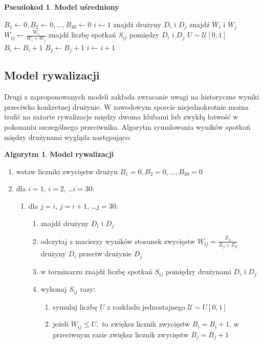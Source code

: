 \documentclass[inzynierska]{pwr_wmat_praca_dyplomowa}
\theoremstyle{plain}
\numberwithin{theorem}{chapter}
\theoremstyle{definition}
\numberwithin{theorem}{chapter}
\newtheorem{algorytm}[theorem]{Algorytm}
\newtheorem{pseudokod}[theorem]{Pseudokod}
\begin{document}
\begin{pseudokod}
	\textbf{Model uśredniony}
	\begin{algorithmic}[1]
		\State $B_1\gets 0,B_2\gets 0,\dots, B_{30}\gets 0$
		\State $i\gets 1$
		\State znajdź drużyny $D_i$ i $D_j$
		\State znajdź $W_i$ i $W_j$ 
		\State $W_{ij}\gets\frac{W_i}{W_i + W_j}$
		\State znajdź liczbę spotkań $S_{ij}$ pomiędzy $D_i$ i $D_j$
		\State $U\sim \mathcal{U}[0,1]$
		\State $B_i \gets B_i+1$
		\Else
		\State $B_j \gets B_j+1$
		\EndIf
		\EndFor
		\EndFor
		\State $i\gets i+1$
		\EndWhile
	\end{algorithmic}
\end{pseudokod}

\subsection{Model rywalizacji}
Drugi z zaproponowanych modeli zakłada zwracanie uwagi na historyczne wyniki przeciwko konkretnej drużynie. W zawodowym sporcie niejednokrotnie można trafić na zażarte rywalizacje między dwoma klubami lub zwykłą łatwość w pokonaniu szczególnego przeciwnika. Algorytm symulowania wyników spotkań między drużynami wygląda następująco:

\begin{algorytm} \textbf{Model rywalizacji}
	\begin{enumerate}
		\item wstaw liczniki zwycięstw drużyn $B_1= 0,B_2= 0,\dots, B_{30}= 0$
		\item dla $i=1$, $i=2$, \dots $i=30$: 
		\begin{enumerate}
			\item dla $j=i$, $j=i+1$, \dots $j=30$: 
			\begin{enumerate}
				\item znajdź drużyny $D_i$ i $D_j$
				\item odczytaj z macierzy wyników stosunek zwycięstw $W_{ij}=\frac{Z_{ij}}{Z_{ij}+Z_{ji}}$ drużyny $D_i$ przeciw drużynie $D_j$   
				\item w terminarzu znajdź liczbę spotkań $S_{ij}$ pomiędzy drużynami $D_i$ i $D_j$
				\item wykonaj $S_{ij}$ razy:
				\begin{enumerate}
					\item symuluj liczbę $U$ z rozkładu jednostajnego $\mathcal{U}\sim U[0,1]$ 
					\item jeżeli $W_{ij} \leq U,$ to zwiększ licznik zwycięstw $B_i=B_i+1$, w przeciwnym razie zwiększ licznik zwycięstw $B_j=B_j+1$
				\end{enumerate}
			\end{enumerate}
		\end{enumerate}
	\end{enumerate}
\end{algorytm} 
\end{document}
